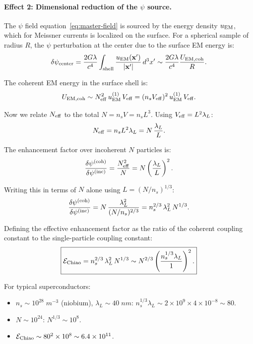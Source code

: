 \documentclass[aps,prd,twocolumn,superscriptaddress,floatfix,nofootinbib]{revtex4-2}
\newcommand{\lam}{\lambda}
\begin{document}
\paragraph{Effect 2: Dimensional reduction of the $\psi$ source.}
The $\psi$ field equation~\eqref{eq:master-field} is sourced by
the energy density $u_{\rm EM}$, which for Meissner currents is
localized on the surface. For a spherical sample of radius $R$,
the $\psi$ perturbation at the center due to the surface EM energy is:
\begin{equation}
\delta\psi_{\rm center}
= \frac{2G\lam}{c^4}\int_{\rm shell}
\frac{u_{\rm EM}(\mathbf{x}')}{|\mathbf{x}'|}\,d^3x'
\sim \frac{2G\lam}{c^4}\frac{U_{\rm EM,coh}}{R}.
\end{equation}

The coherent EM energy in the surface shell is:
\begin{equation}
U_{\rm EM,coh} \sim N_{\rm eff}^2\,u_{\rm EM}^{(1)}\,V_{\rm eff}
= (n_s V_{\rm eff})^2\,u_{\rm EM}^{(1)}\,V_{\rm eff}.
\end{equation}

Now we relate $N_{\rm eff}$ to the total $N = n_s V = n_s L^3$.
Using $V_{\rm eff} = L^2 \lambda_L$:
\begin{equation}
N_{\rm eff} = n_s L^2 \lambda_L = N\,\frac{\lambda_L}{L}.
\end{equation}

The enhancement factor over incoherent $N$ particles is:
\begin{equation}
\frac{\delta\psi^{(\rm coh)}}{\delta\psi^{(\rm inc)}}
= \frac{N_{\rm eff}^2}{N}
= N\left(\frac{\lambda_L}{L}\right)^2.
\end{equation}

Writing this in terms of $N$ alone using $L = (N/n_s)^{1/3}$:
\begin{equation}
\frac{\delta\psi^{(\rm coh)}}{\delta\psi^{(\rm inc)}}
= N\,\frac{\lambda_L^2}{(N/n_s)^{2/3}}
= n_s^{2/3}\,\lambda_L^2\,N^{1/3}.
\end{equation}

Defining the effective enhancement factor as the ratio of the
coherent coupling constant to the single-particle coupling constant:
\begin{equation}
\boxed{
\mathcal{E}_{\rm Chiao} = n_s^{2/3}\,\lambda_L^2\,N^{1/3}
\sim N^{2/3}\left(\frac{n_s^{1/3}\lambda_L}{1}\right)^2.
}
\label{eq:Chiao-enhancement}
\end{equation}

For typical superconductors:
\begin{itemize}[nosep]
\item $n_s \sim 10^{28}\;\si{m^{-3}}$ (niobium),
$\lambda_L \sim 40\;\si{nm}$:
$n_s^{1/3}\lambda_L \sim 2 \times 10^9 \times 4 \times 10^{-8}
\sim 80$.
\item $N \sim 10^{24}$:
$N^{1/3} \sim 10^8$.
\item $\mathcal{E}_{\rm Chiao} \sim 80^2 \times 10^8
\sim 6.4 \times 10^{11}$.
\end{itemize}
\end{document}
